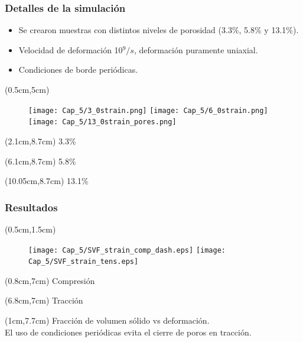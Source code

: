 \begin{frame}
    \frametitle{Detalles de la simulaci\'on}
    \vspace{0cm}
    \begin{itemize}
        \item Se crearon muestras con distintos niveles de porosidad (3.3\%, 5.8\% y 13.1\%).
        \item Velocidad de deformaci\'on 10$^9/s$, deformaci\'on puramente uniaxial.
        \item Condiciones de borde peri\'odicas.
    \end{itemize}
    \begin{textblock*}{12cm}(0.5cm,5cm)
      \begin{figure}[htp]
	\texttt{[image: Cap\_5/3\_0strain.png]}
	\texttt{[image: Cap\_5/6\_0strain.png]}
	\texttt{[image: Cap\_5/13\_0strain\_pores.png]}
      \end{figure}
    \end{textblock*}
    \begin{textblock*}{2cm}(2.1cm,8.7cm)
      \scriptsize{3.3\%}
    \end{textblock*}
    \begin{textblock*}{2cm}(6.1cm,8.7cm)
      \scriptsize{5.8\%}
    \end{textblock*}
    \begin{textblock*}{2cm}(10.05cm,8.7cm)
      \scriptsize{13.1\%}
    \end{textblock*}
\end{frame}

\begin{frame}
 \frametitle{Resultados}
 \begin{textblock*}{12cm}(0.5cm,1.5cm)
  \begin{figure}[htp]
      \texttt{[image: Cap\_5/SVF\_strain\_comp\_dash.eps]}
      \texttt{[image: Cap\_5/SVF\_strain\_tens.eps]}
  \end{figure}
 \end{textblock*}
 \begin{textblock*}{6cm}(0.8cm,7cm)
  \centering
  \scriptsize{Compresi\'on}
 \end{textblock*}
 \begin{textblock*}{6cm}(6.8cm,7cm)
  \centering
  \scriptsize{Tracci\'on}
 \end{textblock*}
  \begin{textblock*}{\textwidth}(1cm,7.7cm)
  \centering
  Fracci\'on de volumen s\'olido vs deformaci\'on.\\
  El uso de condiciones peri\'odicas evita el cierre de poros en tracci\'on.
 \end{textblock*}
\end{frame}


